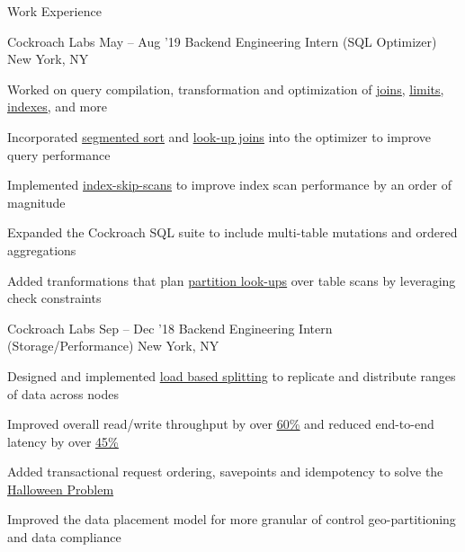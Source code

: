 \documentclass{resume} %
\begin{document}
\begin{rSection}{Work Experience}
  \begin{rSubsection}{Cockroach Labs}
    {May -- Aug '19}
         {Backend Engineering Intern (SQL Optimizer)}
         {New York, NY}
       \item Worked on query compilation, transformation and
         optimization of
         \setul{4pt}{.4pt}
         \href{https://github.com/cockroachdb/cockroach/pull/38285}{\ul{joins}},
         \href{https://github.com/cockroachdb/cockroach/pull/38660}{\ul{limits}}, 
         \href{https://github.com/cockroachdb/cockroach/pull/37616}{\ul{indexes}}, 
         and more
       \item Incorporated 
         \href{https://github.com/cockroachdb/cockroach/pull/38452}{\underline{segmented
             sort}}
         and 
         \href{https://github.com/cockroachdb/cockroach/pull/38285}{\underline{look-up
             joins}} into the optimizer
         to improve query performance
       \item Implemented
         \href{https://github.com/cockroachdb/cockroach/pull/39668}{\ul{index-skip-scans}}
         to improve index scan performance by an order of magnitude
       \item Expanded the Cockroach SQL suite to include multi-table mutations
         and ordered aggregations
       \item Added tranformations that plan 
         \href{https://github.com/cockroachdb/cockroach/pull/38963}{\underline{partition look-ups}}
         over table scans by leveraging check constraints
  \end{rSubsection}

  \begin{rSubsection}{Cockroach Labs}
    {Sep -- Dec '18}
         {Backend Engineering Intern (Storage/Performance)}
         {New York, NY}
       \item Designed and implemented \href{https://github.com/cockroachdb/cockroach/pull/31413}
      {\underline{load based splitting}} to replicate
      and distribute ranges of data across nodes
    \item Improved overall read/write throughput by over
         \setul{4pt}{.4pt}
         \href{https://github.com/cockroachdb/cockroach/issues/31819}{\ul{60\%}}
         and reduced end-to-end latency by over
         \href{https://github.com/cockroachdb/cockroach/issues/31819}{\ul{45\%}}
       \item Added transactional request
           ordering, savepoints and idempotency to solve the 
         \setul{4pt}{.4pt}
         \href{https://github.com/cockroachdb/cockroach/pull/33244}{\ul{Halloween
             Problem}}
       \item Improved the data placement
         model for more granular of control geo-partitioning and data compliance
  \end{rSubsection}


\end{rSection}
\end{document}
